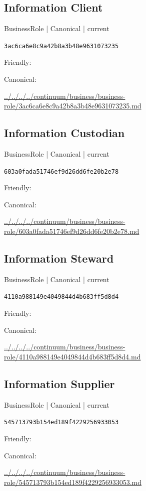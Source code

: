 \documentclass[10pt,a4paper]{article}
\begin{document}
\subsection*{Information Client}
{\small BusinessRole | Canonical | current}\par
\texttt{3ac6ca6e8c9a42b8a3b48e9631073235}\par
Friendly: \par
Canonical: \par
{\footnotesize\url{../../../../continuum/business/business-role/3ac6ca6e8c9a42b8a3b48e9631073235.md}}\par
\subsection*{Information Custodian}
{\small BusinessRole | Canonical | current}\par
\texttt{603a0fada51746ef9d26dd6fe20b2e78}\par
Friendly: \par
Canonical: \par
{\footnotesize\url{../../../../continuum/business/business-role/603a0fada51746ef9d26dd6fe20b2e78.md}}\par
\subsection*{Information Steward}
{\small BusinessRole | Canonical | current}\par
\texttt{4110a988149e4049844d4b683ff5d8d4}\par
Friendly: \par
Canonical: \par
{\footnotesize\url{../../../../continuum/business/business-role/4110a988149e4049844d4b683ff5d8d4.md}}\par
\subsection*{Information Supplier}
{\small BusinessRole | Canonical | current}\par
\texttt{545713793b154ed189f4229256933053}\par
Friendly: \par
Canonical: \par
{\footnotesize\url{../../../../continuum/business/business-role/545713793b154ed189f4229256933053.md}}\par
\end{document}
